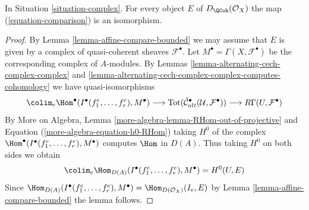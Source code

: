 \begin{proposition}
\label{proposition-represent-cohomology-class-on-open}
In Situation \ref{situation-complex}. For every object $E$
of $D_\QCoh(\mathcal{O}_X)$ the map
(\ref{equation-comparison}) is an isomorphism.
\end{proposition}

\begin{proof}
By Lemma \ref{lemma-affine-compare-bounded} we may assume that $E$
is given by a complex of quasi-coherent sheaves $\mathcal{F}^\bullet$.
Let $M^\bullet = \Gamma(X, \mathcal{F}^\bullet)$ be the corresponding
complex of $A$-modules. By
Lemmas \ref{lemma-alternating-cech-complex-complex} and
\ref{lemma-alternating-cech-complex-complex-computes-cohomology}
we have quasi-isomorphisms
$$
\colim_e \Hom^\bullet(I^\bullet(f_1^e, \ldots, f_r^e), M^\bullet)
\longrightarrow
\text{Tot}(\check{\mathcal{C}}_{alt}^\bullet(\mathcal{U}, \mathcal{F}^\bullet))
\longrightarrow
R\Gamma(U, \mathcal{F}^\bullet)
$$
By More on Algebra, Lemma \ref{more-algebra-lemma-RHom-out-of-projective} and
Equation (\ref{more-algebra-equation-h0-RHom})
taking $H^0$ of the complex
$\Hom^\bullet(I^\bullet(f_1^e, \ldots, f_r^e), M^\bullet)$
computes $\Hom$ in $D(A)$. Thus taking $H^0$ on both sides we obtain
$$
\colim_e \Hom_{D(A)}(I^\bullet(f_1^e, \ldots, f_r^e), M^\bullet)
=
H^0(U, E)
$$
Since $\Hom_{D(A)}(I^\bullet(f_1^e, \ldots, f_r^e), M^\bullet) =
\Hom_{D(\mathcal{O}_X)}(I_e, E)$ by
Lemma \ref{lemma-affine-compare-bounded} the lemma follows.
\end{proof}
